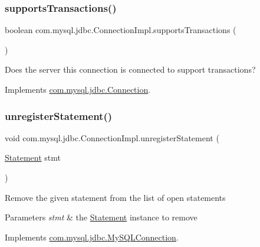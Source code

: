 \subsubsection{\texorpdfstring{supports\+Transactions()}{supportsTransactions()}}
{\footnotesize\ttfamily boolean com.\+mysql.\+jdbc.\+Connection\+Impl.\+supports\+Transactions (\begin{DoxyParamCaption}{ }\end{DoxyParamCaption})}

Does the server this connection is connected to support transactions? 

Implements \mbox{\hyperlink{interfacecom_1_1mysql_1_1jdbc_1_1_connection_a730de8090ab7cf2acfbcb2fefbd84ea2}{com.\+mysql.\+jdbc.\+Connection}}.

\mbox{\label{classcom_1_1mysql_1_1jdbc_1_1_connection_impl_ae3bb2f74be0e7ef1eaf6bc1f6b31c1ec}} 
\subsubsection{\texorpdfstring{unregister\+Statement()}{unregisterStatement()}}
{\footnotesize\ttfamily void com.\+mysql.\+jdbc.\+Connection\+Impl.\+unregister\+Statement (\begin{DoxyParamCaption}\item[{\mbox{\hyperlink{interfacecom_1_1mysql_1_1jdbc_1_1_statement}{Statement}}}]{stmt }\end{DoxyParamCaption})}

Remove the given statement from the list of open statements


\begin{DoxyParams}{Parameters}
{\em stmt} & the \mbox{\hyperlink{interfacecom_1_1mysql_1_1jdbc_1_1_statement}{Statement}} instance to remove \\
\hline
\end{DoxyParams}


Implements \mbox{\hyperlink{interfacecom_1_1mysql_1_1jdbc_1_1_my_s_q_l_connection}{com.\+mysql.\+jdbc.\+My\+S\+Q\+L\+Connection}}.

\mbox{\label{classcom_1_1mysql_1_1jdbc_1_1_connection_impl_ac3cf366e43f103cfc8b29b81a2a1d25e}} 

